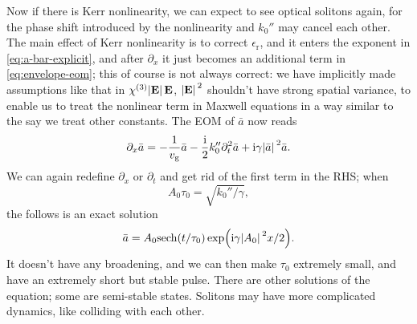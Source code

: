 \documentclass[hyperref, a4paper]{article}
\newcommand*{\ii}{\mathrm{i}}
\newcommand{\epsr}{\epsilon_{\text{r}}}
\begin{document}
Now if there is Kerr nonlinearity, we can expect to see optical solitons again,
for the phase shift introduced by the nonlinearity and $k_0''$ may cancel each other.
The main effect of Kerr nonlinearity is to correct $\epsr$,
and it enters the exponent in \eqref{eq:a-bar-explicit},
and after $\partial_x$ it just becomes an additional term in \eqref{eq:envelope-eom}; 
this of course is not always correct: 
we have implicitly made assumptions like that in $\chi^{(3)} \abs*{\vb{E}} \vb{E}$, 
$\abs*{\vb{E}}^2$ shouldn't have strong spatial variance, 
to enable us to treat the nonlinear term in Maxwell equations 
in a way similar to the say we treat other constants. 
The EOM of $\bar{a}$ now reads 
\begin{equation}
    \partial_x \bar{a} = - \frac{1}{v_{\text{g}}} \bar{a} 
    - \frac{\ii}{2} k_0'' \partial_t^2 \bar{a} 
    + \ii \gamma \abs*{\bar{a}}^2 \bar{a}.
\end{equation}
We can again redefine $\partial_x$ or $\partial_t$ and get rid of the first term in the RHS; 
when 
\begin{equation}
    A_0 \tau_0 = \sqrt{k_0'' / \gamma},
\end{equation}
the follows is an exact solution
\begin{equation}
    \bar{a} = A_0 \mathrm{sech} (t / \tau_0) \exp(\ii \gamma \abs*{A_0}^2 x / 2).
\end{equation}
It doesn't have any broadening, and we can then make $\tau_0$ extremely small,
and have an extremely short but stable pulse.
There are other solutions of the equation;
some are semi-stable states.
Solitons may have more complicated dynamics,
like colliding with each other.
\end{document}

